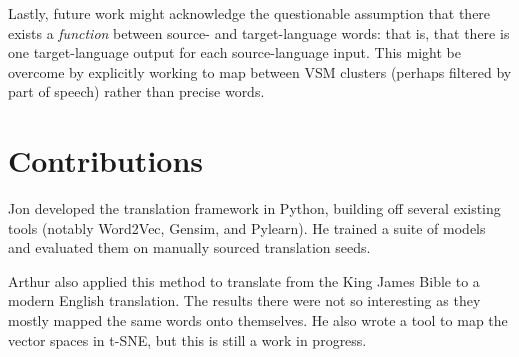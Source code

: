 \documentclass[11pt]{article}
\begin{document}
Lastly, future work might acknowledge the questionable assumption that there
exists a \emph{function} between source- and target-language words: that is,
that there is one target-language output for each source-language input. This
might be overcome by explicitly working to map between VSM clusters (perhaps
filtered by part of speech) rather than precise words. %


\section{Contributions}
\label{sec:contributions}

Jon developed the translation framework in Python, building off several existing tools (notably Word2Vec, Gensim, and Pylearn). He trained a suite of models and evaluated them on manually sourced translation seeds.

Arthur also applied this method to translate from the King James Bible
to a modern English translation. The results there were not so
interesting as they mostly mapped the same words onto themselves. He
also wrote a tool to map the vector spaces in t-SNE, but this is still
a work in progress.



\end{document}
